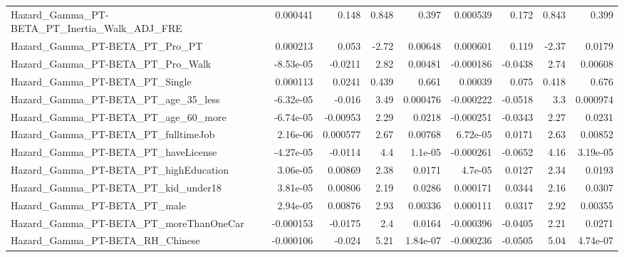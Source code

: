 \begin{tabular}{lrrrrrrrr}
Hazard\_Gamma\_PT-BETA\_PT\_Inertia\_Walk\_ADJ\_FRE       &    0.000441 &        0.148 &    0.848 &    0.397 &   0.000539 &       0.172 &        0.843 &         0.399 \\
Hazard\_Gamma\_PT-BETA\_PT\_Pro\_PT                     &    0.000213 &        0.053 &    -2.72 &  0.00648 &   0.000601 &       0.119 &        -2.37 &        0.0179 \\
Hazard\_Gamma\_PT-BETA\_PT\_Pro\_Walk                   &   -8.53e-05 &      -0.0211 &     2.82 &  0.00481 &  -0.000186 &     -0.0438 &         2.74 &       0.00608 \\
Hazard\_Gamma\_PT-BETA\_PT\_Single                     &    0.000113 &       0.0241 &    0.439 &    0.661 &    0.00039 &       0.075 &        0.418 &         0.676 \\
Hazard\_Gamma\_PT-BETA\_PT\_age\_35\_less                &   -6.32e-05 &       -0.016 &     3.49 & 0.000476 &  -0.000222 &     -0.0518 &          3.3 &      0.000974 \\
Hazard\_Gamma\_PT-BETA\_PT\_age\_60\_more                &   -6.74e-05 &     -0.00953 &     2.29 &   0.0218 &  -0.000251 &     -0.0343 &         2.27 &        0.0231 \\
Hazard\_Gamma\_PT-BETA\_PT\_fulltimeJob                &    2.16e-06 &     0.000577 &     2.67 &  0.00768 &   6.72e-05 &      0.0171 &         2.63 &       0.00852 \\
Hazard\_Gamma\_PT-BETA\_PT\_haveLicense                &   -4.27e-05 &      -0.0114 &      4.4 &  1.1e-05 &  -0.000261 &     -0.0652 &         4.16 &      3.19e-05 \\
Hazard\_Gamma\_PT-BETA\_PT\_highEducation              &    3.06e-05 &      0.00869 &     2.38 &   0.0171 &    4.7e-05 &      0.0127 &         2.34 &        0.0193 \\
Hazard\_Gamma\_PT-BETA\_PT\_kid\_under18                &    3.81e-05 &      0.00806 &     2.19 &   0.0286 &   0.000171 &      0.0344 &         2.16 &        0.0307 \\
Hazard\_Gamma\_PT-BETA\_PT\_male                       &    2.94e-05 &      0.00876 &     2.93 &  0.00336 &   0.000111 &      0.0317 &         2.92 &       0.00355 \\
Hazard\_Gamma\_PT-BETA\_PT\_moreThanOneCar             &   -0.000153 &      -0.0175 &      2.4 &   0.0164 &  -0.000396 &     -0.0405 &         2.21 &        0.0271 \\
Hazard\_Gamma\_PT-BETA\_RH\_Chinese                    &   -0.000106 &       -0.024 &     5.21 & 1.84e-07 &  -0.000236 &     -0.0505 &         5.04 &      4.74e-07 \\

\end{tabular}
